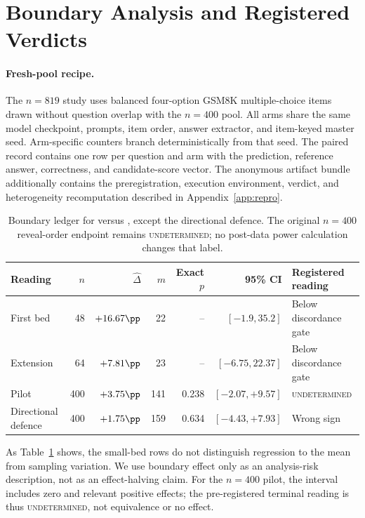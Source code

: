 \section{Boundary Analysis and Registered Verdicts}
\label{sec:boundary}

\paragraph{Fresh-pool recipe.}
The $n=819$ study uses balanced four-option GSM8K multiple-choice items drawn
without question overlap with the $n=400$ pool.  All arms share the same model
checkpoint, prompts, item order, answer extractor, and item-keyed master seed.
Arm-specific counters branch deterministically from that seed.  The paired
record contains one row per question and arm with the prediction, reference
answer, correctness, and candidate-score vector.  The anonymous artifact
bundle additionally contains the preregistration, execution environment,
verdict, and heterogeneity recomputation described in
Appendix~\ref{app:repro}.

\begin{table}[H]
\centering
\small
\setlength{\tabcolsep}{4pt}
\caption{Boundary ledger for \sconf{} versus \rinj{}, except the directional
defence.  The original $n=400$ reveal-order endpoint remains
\textsc{undetermined}; no post-data power calculation changes that label.}
\label{tab:boundary-ledger}
\begin{tabular}{@{}lrrrrrp{}@{}}
\toprule
Reading & $n$ & $\widehat\Delta$ & $m$ & Exact $p$ & 95\% CI & Registered reading \\
\midrule
First bed & 48 & $+16.67\pp$ & 22 & -- & $[-1.9,35.2]$ & Below discordance gate \\
Extension & 64 & $+7.81\pp$ & 23 & -- & $[-6.75,22.37]$ & Below discordance gate \\
Pilot & 400 & $+3.75\pp$ & 141 & 0.238 & $[-2.07,+9.57]$ & \textsc{undetermined} \\
Directional defence & 400 & $+1.75\pp$ & 159 & 0.634 & $[-4.43,+7.93]$ & Wrong sign \\
\bottomrule
\end{tabular}
\end{table}

As Table~\ref{tab:boundary-ledger} shows, the small-bed rows do not distinguish
regression to the mean from sampling
variation.  We use boundary effect only as an analysis-risk description, not
as an effect-halving claim.  For the $n=400$ pilot, the interval includes zero
and relevant positive effects; the pre-registered terminal reading is thus
\textsc{undetermined}, not equivalence or no effect.

